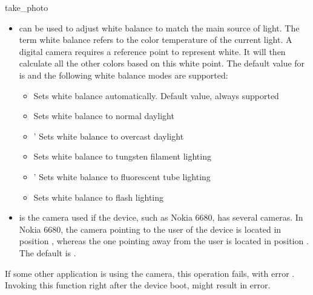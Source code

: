 \begin{funcdesc}{take_photo}{}
\begin{itemize}
\item {} can be used to adjust white balance to match the main source of light. The term white balance refers to the color temperature of the current light. A digital camera requires a reference point to represent white. It will then calculate all the other colors based on this white point. The default value for  is  and the following white balance modes are supported:
	\begin{itemize}
	\item {} \newline
Sets white balance automatically. Default value, always supported
	\item {} \newline
Sets white balance to normal daylight
	\item {}' \newline
Sets white balance to overcast daylight
	\item {} \newline
Sets white balance to tungsten filament lighting
	\item {}' \newline
Sets white balance to fluorescent tube lighting
	\item {} \newline
Sets white balance to flash lighting
	\end{itemize}
\item {} is the camera used if the device, such as Nokia 6680, has several cameras. In Nokia 6680, the camera pointing to the user of the device is located in position , whereas the one pointing away from the user is located in position . The default  is .
\end{itemize}

If some other application is using the camera, this operation fails, with error 
. Invoking this function right after the device 
boot, might result in  error.

\end{funcdesc}


